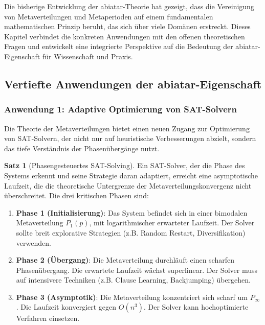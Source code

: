 \documentclass[a4paper,12pt]{article}
\theoremstyle{definition}
\newtheorem{satz}{Satz}
\begin{document}
Die bisherige Entwicklung der abiatar-Theorie hat gezeigt, dass die Vereinigung von Metaverteilungen und Metaperioden auf einem fundamentalen mathematischen Prinzip beruht, das sich über viele Domänen erstreckt. Dieses Kapitel verbindet die konkreten Anwendungen mit den offenen theoretischen Fragen und entwickelt eine integrierte Perspektive auf die Bedeutung der abiatar-Eigenschaft für Wissenschaft und Praxis.

\subsection{Vertiefte Anwendungen der abiatar-Eigenschaft}

\subsubsection{Anwendung 1: Adaptive Optimierung von SAT-Solvern}

Die Theorie der Metaverteilungen bietet einen neuen Zugang zur Optimierung von SAT-Solvern, der nicht nur auf heuristische Verbesserungen abzielt, sondern das tiefe Verständnis der Phasenübergänge nutzt.

\begin{satz}[Phasengesteuertes SAT-Solving]
Ein SAT-Solver, der die Phase des Systems erkennt und seine Strategie daran adaptiert, erreicht eine asymptotische Laufzeit, die die theoretische Untergrenze der Metaverteilungskonvergenz nicht überschreitet. Die drei kritischen Phasen sind:

\begin{enumerate}
\item \textbf{Phase 1 (Initialisierung)}: Das System befindet sich in einer bimodalen Metaverteilung $P_1(p)$, mit logarithmischer erwarteter Laufzeit. Der Solver sollte breit explorative Strategien (z.B. Random Restart, Diversifikation) verwenden.

\item \textbf{Phase 2 (Übergang)}: Die Metaverteilung durchläuft einen scharfen Phasenübergang. Die erwartete Laufzeit wächst superlinear. Der Solver muss auf intensivere Techniken (z.B. Clause Learning, Backjumping) übergehen.

\item \textbf{Phase 3 (Asymptotik)}: Die Metaverteilung konzentriert sich scharf um $P_\infty$. Die Laufzeit konvergiert gegen $O(n^3)$. Der Solver kann hochoptimierte Verfahren einsetzen.
\end{enumerate}
\end{satz}
\end{document}
